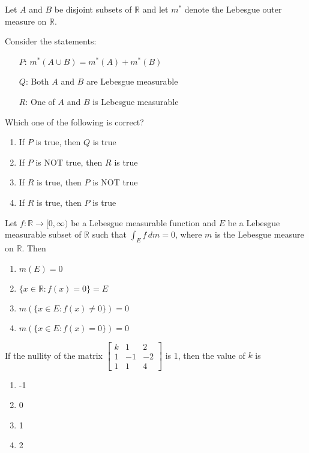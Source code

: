     \item Let $A$ and $B$ be disjoint subsets of $\mathbb{R}$ and let $m^*$ denote the Lebesgue outer measure on $\mathbb{R}$.

    Consider the statements:
    \begin{itemize}
        \item[$P$:] $m^*(A \cup B) = m^*(A) + m^*(B)$
        \item[$Q$:] Both $A$ and $B$ are Lebesgue measurable
        \item[$R$:] One of $A$ and $B$ is Lebesgue measurable
    \end{itemize}
    
    Which one of the following is correct?
    \begin{multicols}{2}
    \begin{enumerate}
        \item If $P$ is true, then $Q$ is true
        \item If $P$ is NOT true, then $R$ is true
        \item If $R$ is true, then $P$ is NOT true
        \item If $R$ is true, then $P$ is true
    \end{enumerate}
    \end{multicols}

    \item Let $f : \mathbb{R} \rightarrow [0, \infty)$ be a Lebesgue measurable function and $E$ be a Lebesgue measurable subset of $\mathbb{R}$ such that $\int_E f \, dm = 0$, where $m$ is the Lebesgue measure on $\mathbb{R}$. Then
    \begin{multicols}{2}
    \begin{enumerate}
        \item $m(E) = 0$
        \item $\{x \in \mathbb{R} : f(x) = 0\} = E$
        \item $m(\{x \in E : f(x) \neq 0\}) = 0$
        \item $m(\{x \in E : f(x) = 0\}) = 0$
    \end{enumerate}
    \end{multicols}

    \item If the nullity of the matrix 
    $\begin{bmatrix} k & 1 & 2 \\ 1 & -1 & -2 \\ 1 & 1 & 4 \end{bmatrix}$ is 1, then the value of $k$ is
    \begin{multicols}{4}
    \begin{enumerate}
        \item -1
        \item 0
        \item 1
        \item 2
    \end{enumerate}
    \end{multicols}

